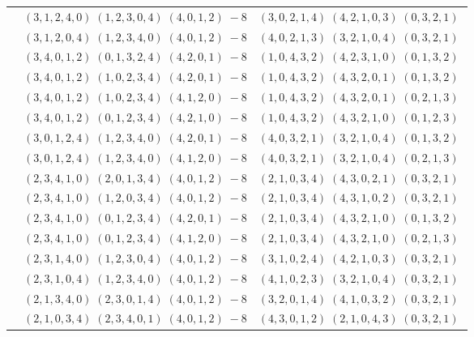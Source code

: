 \documentclass[11pt]{article}
\begin{document}
\begin{longtable}[l]{|c|c|c|}
 \cline{2-3} 
 & $(3 ,1 ,2 ,4 ,0) \;(1 ,2 ,3 ,0 ,4) \;(4 ,0 ,1 ,2) \;-8$ & $(3 ,0 ,2 ,1 ,4) \;(4 ,2 ,1 ,0 ,3) \;(0 ,3 ,2 ,1) \;$\\ 
 \cline{2-3} 
 & $(3 ,1 ,2 ,0 ,4) \;(1 ,2 ,3 ,4 ,0) \;(4 ,0 ,1 ,2) \;-8$ & $(4 ,0 ,2 ,1 ,3) \;(3 ,2 ,1 ,0 ,4) \;(0 ,3 ,2 ,1) \;$\\ 
 \cline{2-3} 
 & $(3 ,4 ,0 ,1 ,2) \;(0 ,1 ,3 ,2 ,4) \;(4 ,2 ,0 ,1) \;-8$ & $(1 ,0 ,4 ,3 ,2) \;(4 ,2 ,3 ,1 ,0) \;(0 ,1 ,3 ,2) \;$\\ 
 \cline{2-3} 
 & $(3 ,4 ,0 ,1 ,2) \;(1 ,0 ,2 ,3 ,4) \;(4 ,2 ,0 ,1) \;-8$ & $(1 ,0 ,4 ,3 ,2) \;(4 ,3 ,2 ,0 ,1) \;(0 ,1 ,3 ,2) \;$\\ 
 \cline{2-3} 
 & $(3 ,4 ,0 ,1 ,2) \;(1 ,0 ,2 ,3 ,4) \;(4 ,1 ,2 ,0) \;-8$ & $(1 ,0 ,4 ,3 ,2) \;(4 ,3 ,2 ,0 ,1) \;(0 ,2 ,1 ,3) \;$\\ 
 \cline{2-3} 
 & $(3 ,4 ,0 ,1 ,2) \;(0 ,1 ,2 ,3 ,4) \;(4 ,2 ,1 ,0) \;-8$ & $(1 ,0 ,4 ,3 ,2) \;(4 ,3 ,2 ,1 ,0) \;(0 ,1 ,2 ,3) \;$\\ 
 \cline{2-3} 
 & $(3 ,0 ,1 ,2 ,4) \;(1 ,2 ,3 ,4 ,0) \;(4 ,2 ,0 ,1) \;-8$ & $(4 ,0 ,3 ,2 ,1) \;(3 ,2 ,1 ,0 ,4) \;(0 ,1 ,3 ,2) \;$\\ 
 \cline{2-3} 
 & $(3 ,0 ,1 ,2 ,4) \;(1 ,2 ,3 ,4 ,0) \;(4 ,1 ,2 ,0) \;-8$ & $(4 ,0 ,3 ,2 ,1) \;(3 ,2 ,1 ,0 ,4) \;(0 ,2 ,1 ,3) \;$\\ 
 \cline{2-3} 
 & $(2 ,3 ,4 ,1 ,0) \;(2 ,0 ,1 ,3 ,4) \;(4 ,0 ,1 ,2) \;-8$ & $(2 ,1 ,0 ,3 ,4) \;(4 ,3 ,0 ,2 ,1) \;(0 ,3 ,2 ,1) \;$\\ 
 \cline{2-3} 
 & $(2 ,3 ,4 ,1 ,0) \;(1 ,2 ,0 ,3 ,4) \;(4 ,0 ,1 ,2) \;-8$ & $(2 ,1 ,0 ,3 ,4) \;(4 ,3 ,1 ,0 ,2) \;(0 ,3 ,2 ,1) \;$\\ 
 \cline{2-3} 
 & $(2 ,3 ,4 ,1 ,0) \;(0 ,1 ,2 ,3 ,4) \;(4 ,2 ,0 ,1) \;-8$ & $(2 ,1 ,0 ,3 ,4) \;(4 ,3 ,2 ,1 ,0) \;(0 ,1 ,3 ,2) \;$\\ 
 \cline{2-3} 
 & $(2 ,3 ,4 ,1 ,0) \;(0 ,1 ,2 ,3 ,4) \;(4 ,1 ,2 ,0) \;-8$ & $(2 ,1 ,0 ,3 ,4) \;(4 ,3 ,2 ,1 ,0) \;(0 ,2 ,1 ,3) \;$\\ 
 \cline{2-3} 
 & $(2 ,3 ,1 ,4 ,0) \;(1 ,2 ,3 ,0 ,4) \;(4 ,0 ,1 ,2) \;-8$ & $(3 ,1 ,0 ,2 ,4) \;(4 ,2 ,1 ,0 ,3) \;(0 ,3 ,2 ,1) \;$\\ 
 \cline{2-3} 
 & $(2 ,3 ,1 ,0 ,4) \;(1 ,2 ,3 ,4 ,0) \;(4 ,0 ,1 ,2) \;-8$ & $(4 ,1 ,0 ,2 ,3) \;(3 ,2 ,1 ,0 ,4) \;(0 ,3 ,2 ,1) \;$\\ 
 \cline{2-3} 
 & $(2 ,1 ,3 ,4 ,0) \;(2 ,3 ,0 ,1 ,4) \;(4 ,0 ,1 ,2) \;-8$ & $(3 ,2 ,0 ,1 ,4) \;(4 ,1 ,0 ,3 ,2) \;(0 ,3 ,2 ,1) \;$\\ 
 \cline{2-3} 
 & $(2 ,1 ,0 ,3 ,4) \;(2 ,3 ,4 ,0 ,1) \;(4 ,0 ,1 ,2) \;-8$ & $(4 ,3 ,0 ,1 ,2) \;(2 ,1 ,0 ,4 ,3) \;(0 ,3 ,2 ,1) \;$\\ 

\end{longtable}
\end{document}
